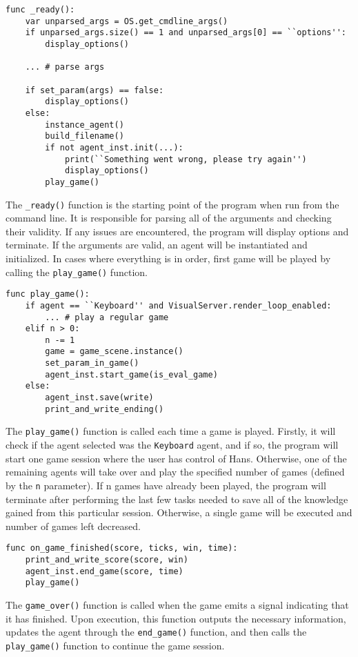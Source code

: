 \begin{center}
\hrulefill
\begin{lstlisting}
func _ready():
    var unparsed_args = OS.get_cmdline_args()
    if unparsed_args.size() == 1 and unparsed_args[0] == ``options'':
        display_options()
		
    ...	# parse args
	
    if set_param(args) == false:
        display_options()
    else:
        instance_agent()
        build_filename()
        if not agent_inst.init(...):
            print(``Something went wrong, please try again'')
            display_options()
        play_game()
\end{lstlisting}
\hrulefill
\end{center}

The \texttt{\_ready()} function is the starting point of the program when run from the command line. It is responsible for parsing all of the arguments and checking their validity. If any issues are encountered, the program will display options and terminate. If the arguments are valid, an agent will be instantiated and initialized. In cases where everything is in order, first game will be played by calling the \texttt{play\_game()} function.

\begin{center}
\hrulefill
\begin{lstlisting}
func play_game():
    if agent == ``Keyboard'' and VisualServer.render_loop_enabled:
        ... # play a regular game
    elif n > 0:
        n -= 1
        game = game_scene.instance()
        set_param_in_game()
        agent_inst.start_game(is_eval_game)
    else:
        agent_inst.save(write)
        print_and_write_ending()
\end{lstlisting}
\hrulefill
\end{center}

The \texttt{play\_game()} function is called each time a game is played. Firstly, it will check if the agent selected was the \texttt{Keyboard} agent, and if so, the program will start one game session where the user has control of Hans. Otherwise, one of the remaining agents will take over and play the specified number of games (defined by the \texttt{n} parameter). If n games have already been played, the program will terminate after performing the last few tasks needed to save all of the knowledge gained from this particular session. Otherwise, a single game will be executed and number of games left decreased.

\begin{center}
\hrulefill
\begin{lstlisting}
func on_game_finished(score, ticks, win, time):
    print_and_write_score(score, win)
    agent_inst.end_game(score, time)
    play_game()
\end{lstlisting}
\hrulefill
\end{center}

The \texttt{game\_over()} function is called when the game emits a signal indicating that it has finished. Upon execution, this function outputs the necessary information, updates the agent through the \texttt{end\_game()} function, and then calls the \texttt{play\_game()} function to continue the game session.